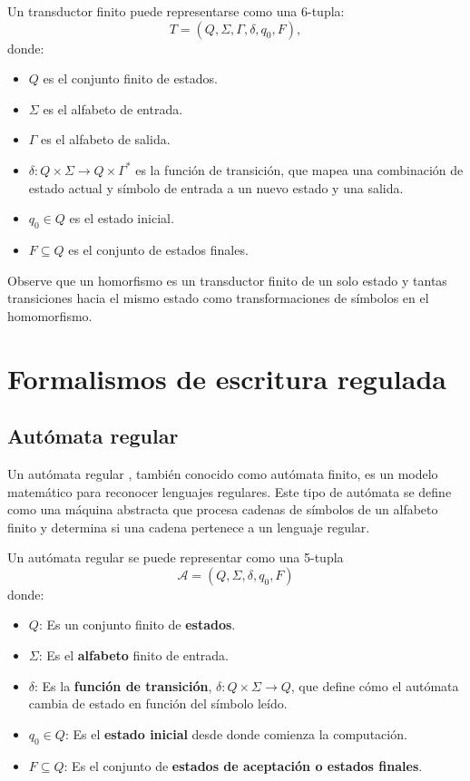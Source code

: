 \documentclass{article}
\begin{document}
Un transductor finito puede representarse como una 6-tupla:
\[
      T = (Q, \Sigma, \Gamma, \delta, q_0, F),
\]
donde:
\begin{itemize}
      \item \(Q\) es el conjunto finito de estados.
      \item \(\Sigma\) es el alfabeto de entrada.
      \item \(\Gamma\) es el alfabeto de salida.
      \item \(\delta: Q \times \Sigma \to Q \times \Gamma^*\) es la función de transición, que mapea una combinación de estado actual y símbolo de entrada a un nuevo estado y una salida.
      \item \(q_0 \in Q\) es el estado inicial.
      \item \(F \subseteq Q\) es el conjunto de estados finales.
\end{itemize}

Observe que un homorfismo es un transductor finito de un solo estado y tantas transiciones hacia el mismo estado como transformaciones
de símbolos en el homomorfismo.


\section{Formalismos de escritura regulada}

\subsection{Autómata regular}

Un autómata regular \cite{authomataTheory}, también conocido como autómata finito, es un modelo matemático para reconocer lenguajes regulares. Este tipo de autómata se define como una máquina abstracta que procesa cadenas de símbolos de un alfabeto finito y determina si una cadena pertenece a un lenguaje regular.

Un autómata regular se puede representar como una 5-tupla $$\mathcal{A} = (Q, \Sigma, \delta, q_0, F)$$ donde:

\begin{itemize}
      \item $Q$: Es un conjunto finito de \textbf{estados}.
      \item $\Sigma$: Es el \textbf{alfabeto} finito de entrada.
      \item $\delta$: Es la \textbf{función de transición}, $\delta: Q \times \Sigma \to Q$, que define cómo el autómata cambia de estado en función del símbolo leído.
      \item $q_0 \in Q$: Es el \textbf{estado inicial} desde donde comienza la computación.
      \item $F \subseteq Q$: Es el conjunto de \textbf{estados de aceptación o estados finales}.
\end{itemize}
\end{document}
